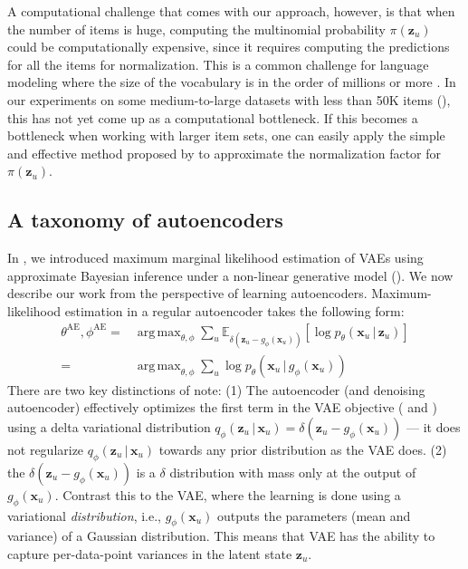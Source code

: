 \documentclass[sigconf]{acmart}
\newcommand{\mathbold}[1]{\ensuremath{\boldsymbol{\mathbf{#1}}}}
\newcommand{\mbx}{\mathbold{x}}
\newcommand{\mbz}{\mathbold{z}}
\newcommand{\g}{\,\vert\,}
\newcommand{\EE}[2]{\mathbb{E}_{#1}\left[#2\right]}
\DeclareMathOperator*{\argmax}{arg\,max}
\begin{document}
A computational challenge that comes with our approach, however, is that when the number of items is huge, computing the 
multinomial probability $\pi(\mbz_u)$ could be computationally expensive, since it requires computing the predictions 
for all the items for normalization. This is a common challenge for language modeling where the size of 
the vocabulary is in the order of millions or more \citep{mikolov2013distributed}. In our experiments on some medium-to-large 
datasets with less than 50K items (), this has not yet come up as a 
computational bottleneck. 
If this becomes a bottleneck when working with larger item sets, one can easily apply the
simple and effective method proposed by \citet{pmlr-v54-botev17a} to approximate the normalization 
factor for $\pi(\mbz_u)$.


\subsection{A taxonomy of autoencoders} \label{sec:mle}

In , we introduced maximum marginal likelihood estimation of \glspl{VAE} using 
approximate Bayesian inference under a non-linear generative model (). 
We now describe our work from the perspective of learning autoencoders.  
Maximum-likelihood estimation in a regular autoencoder takes the following form:
\begin{equation}\label{eq:mle}
\begin{split}
\theta^{\mathrm{AE}}, \phi^{\mathrm{AE}} =&\argmax_{\theta, \phi} \sum_u \EE{\delta(\mbz_u - g_\phi(\mbx_u))}{\log p_\theta(\mbx_u \g \mbz_u)}\\
= &\argmax_{\theta, \phi} \sum_u \log p_\theta(\mbx_u \g g_\phi(\mbx_u))
\end{split}
\end{equation}
There are two key distinctions of note: 
(1) The autoencoder (and denoising autoencoder) effectively optimizes the first term in the \gls{VAE} objective ( 
and ) using a delta variational distribution $q_\phi(\mbz_u \g \mbx_u) = \delta(\mbz_u - g_\phi(\mbx_u))$ --- 
it does not regularize $q_\phi(\mbz_u \g\mbx_u)$ towards any prior distribution as the \gls{VAE} does. 
(2) the $\delta(\mbz_u - g_\phi(\mbx_u))$ is a $\delta$ distribution with 
mass only at the output of $g_{\phi}(\mbx_u)$. Contrast this to the \gls{VAE}, where the learning is done using a variational \emph{distribution},
i.e., $g_{\phi}(\mbx_u)$ outputs the parameters (mean and variance) of a Gaussian distribution. This means that \gls{VAE} has the ability to capture
per-data-point variances in the latent state $\mbz_u$. 
\end{document}
